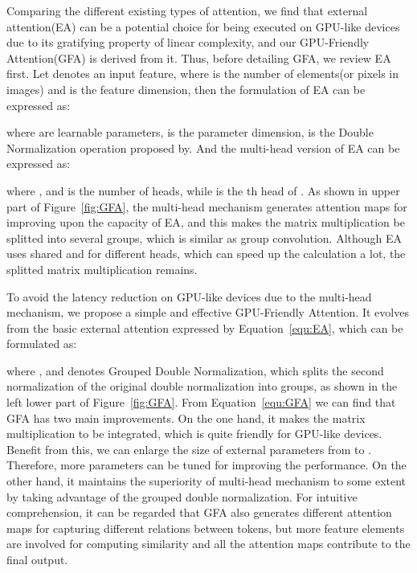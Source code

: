 \documentclass{article}
\begin{document}
Comparing the different existing types of attention, we find that external attention\cite{guo2021beyond}(EA) can be a potential choice for being executed on GPU-like devices due to its gratifying property of linear complexity, and our GPU-Friendly Attention(GFA) is derived from it. Thus, before detailing GFA, we review EA first. Let  denotes an input feature, where  is the number of elements(or pixels in images) and  is the feature dimension, then the formulation of EA can be expressed as:



where  are learnable parameters,  is the parameter dimension,  is the Double Normalization operation proposed by\cite{guo2021beyond}. And the multi-head version of EA can be expressed as:



where ,  and  is the number of heads, while  is the th head of . As shown in upper part of Figure~\ref{fig:GFA}, the multi-head mechanism generates  attention maps for improving upon the capacity of EA, and this makes the matrix multiplication be splitted into several groups, which is similar as group convolution. Although EA uses shared  and  for different heads, which can speed up the calculation a lot, the splitted matrix multiplication remains.

To avoid the latency reduction on GPU-like devices due to the multi-head mechanism, we propose a simple and effective GPU-Friendly Attention. It evolves from the basic external attention expressed by Equation~\ref{equ:EA}, which can be formulated as:



where ,  and  denotes Grouped Double Normalization, which splits the second normalization of the original double normalization into  groups, as shown in the left lower part of Figure~\ref{fig:GFA}. From Equation~\ref{equ:GFA} we can find that GFA has two main improvements. On the one hand, it makes the matrix multiplication to be integrated, which is quite friendly for GPU-like devices. Benefit from this, we can enlarge the size of external parameters from  to . Therefore, more parameters can be tuned for improving the performance. On the other hand, it maintains the superiority of multi-head mechanism to some extent by taking advantage of the grouped double normalization. For intuitive comprehension, it can be regarded that GFA also generates  different attention maps for capturing different relations between tokens, but more feature elements are involved for computing similarity and all the attention maps contribute to the final output.
\end{document}
